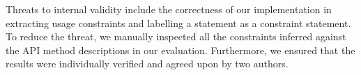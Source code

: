 Threats to internal validity include the correctness of our implementation in extracting usage constraints and labelling a statement as a constraint statement. To reduce the threat, we manually inspected all the constraints inferred against the API method descriptions in our evaluation. Furthermore, we ensured that the results were individually verified and agreed
upon by two authors.




